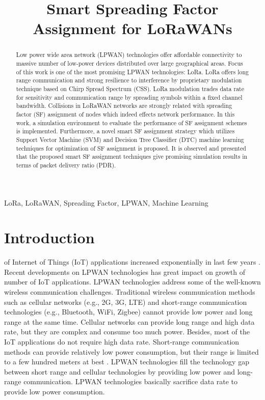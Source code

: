 \documentclass[conference]{IEEEtran}
\begin{document}
\title{Smart Spreading Factor Assignment for LoRaWANs}


\author{
}
\maketitle


\begin{abstract}
Low power wide area network (LPWAN) technologies offer affordable connectivity to massive number of low-power devices distributed over large geographical areas. Focus of this work is one of the most promising LPWAN technologies: LoRa. LoRa offers long range communication and strong resilience to interference by proprietary modulation technique based on Chirp Spread Spectrum (CSS). LoRa modulation trades data rate for sensitivity and communication range by spreading symbols within a fixed channel bandwidth. Collisions in LoRaWAN networks are strongly related with spreading factor (SF) assignment of nodes which indeed effects network performance. In this work, a simulation environment to evaluate the performance of SF assignment schemes is implemented. Furthermore, a novel smart SF assignment strategy which utilizes Support Vector Machine (SVM) and Decision Tree Classifier (DTC) machine learning techniques for optimization of SF assignment is proposed. It is observed and presented that the proposed smart SF assignment techniques give promising simulation results in terms of packet delivery ratio (PDR).
\end{abstract}


\begin{IEEEkeywords}
LoRa, LoRaWAN, Spreading Factor, LPWAN, Machine Learning
\end{IEEEkeywords}


\section{Introduction}
 of Internet of Things (IoT) applications increased exponentially in last few years \cite{7721743}. Recent developments on LPWAN technologies has great impact on growth of number of IoT applications. LPWAN technologies address some of the well-known wireless communication challenges. Traditional wireless communication methods such as cellular networks (e.g., 2G, 3G, LTE) and short-range communication technologies (e.g., Bluetooth, WiFi, Zigbee) cannot provide low power and long range at the same time. Cellular networks can provide long range and high data rate, but they are complex and consume too much power. Besides, most of the IoT applications do not require high data rate. Short-range communication methods can provide relatively low power consumption, but their range is limited to a few hundred meters at best \cite{7815384}. LPWAN technologies fill the technology gap between short range and cellular technologies by providing low power and long-range communication. LPWAN technologies basically sacrifice data rate to provide low power consumption.
\end{document}
